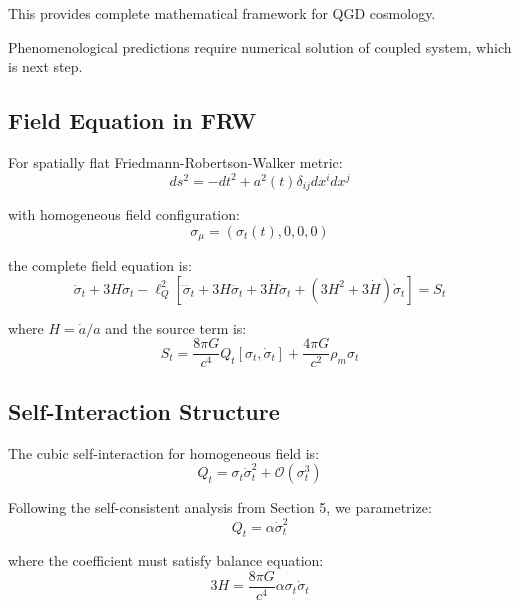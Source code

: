 \documentclass[11pt,a4paper]{article}
\theoremstyle{definition}
\theoremstyle{remark}
\begin{document}
	This provides complete mathematical framework for QGD cosmology.
	
	Phenomenological predictions require numerical solution of coupled system, which is next step.
	
	\subsection{Field Equation in FRW}
	
	For spatially flat Friedmann-Robertson-Walker metric:
	\begin{equation}
		ds^2 = -dt^2 + a^2(t)\delta_{ij}dx^idx^j
	\end{equation}
	
	with homogeneous field configuration:
	\begin{equation}
		\sigma_\mu = (\sigma_t(t), 0, 0, 0)
	\end{equation}
	
	the complete field equation is:
	\begin{equation}\label{eq:field_homogeneous}
		\ddot{\sigma}_t + 3H\dot{\sigma}_t - \ell_Q^2\left[\ddddot{\sigma}_t + 3H\dddot{\sigma}_t + 3\dot{H}\ddot{\sigma}_t + (3H^2 + 3\dot{H})\dot{\sigma}_t\right] = S_t
	\end{equation}
	
	where $H = \dot{a}/a$ and the source term is:
	\begin{equation}
		S_t = \frac{8\pi G}{c^4}Q_t[\sigma_t, \dot{\sigma}_t] + \frac{4\pi G}{c^2}\rho_m\sigma_t
	\end{equation}
	
	\subsection{Self-Interaction Structure}
	
	The cubic self-interaction for homogeneous field is:
	\begin{equation}
		Q_t = \sigma_t\dot{\sigma}_t^2 + \mathcal{O}(\sigma_t^3)
	\end{equation}
	
	Following the self-consistent analysis from Section 5, we parametrize:
	\begin{equation}
		Q_t = \alpha\dot{\sigma}_t^2
	\end{equation}
	
	where the coefficient must satisfy balance equation:
	\begin{equation}
		3H = \frac{8\pi G}{c^4}\alpha\sigma_t\dot{\sigma}_t
	\end{equation}
	
\end{document}
